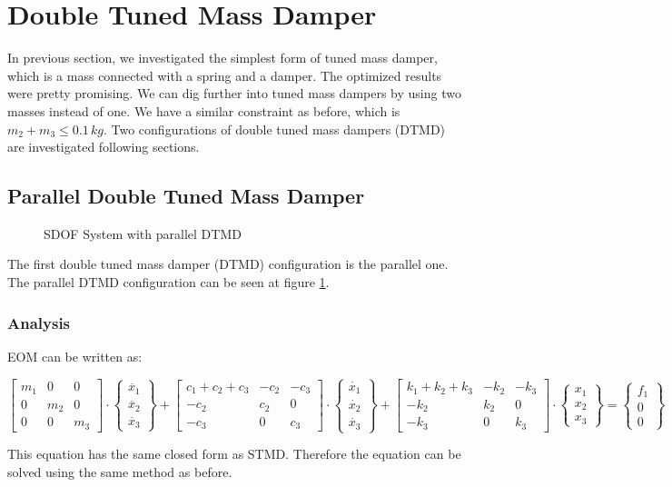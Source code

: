 \section{Double Tuned Mass Damper}
In previous section, we investigated the simplest form of tuned mass damper, which is a mass connected with a spring and a damper. The optimized results were pretty promising. We can dig further into tuned mass dampers by using two masses instead of one. We have a similar constraint as before, which is $m_2+m_3 \leq 0.1\,kg$. Two configurations of double tuned mass dampers (DTMD) are investigated following sections.
\subsection{Parallel Double Tuned Mass Damper}
\begin{figure}[ht]
    \centering
    
    \caption{SDOF System with parallel DTMD}
    \label{fig:pDTMD}
\end{figure}
The first double tuned mass damper (DTMD) configuration is the parallel one. The parallel DTMD configuration can be seen at figure \ref{fig:pDTMD}.
\subsubsection{Analysis}
EOM can be written as:
\begin{center}
$$
\begin{bmatrix}
m_1 & 0 & 0\\
0 & m_2 & 0\\
0 & 0 & m_3
\end{bmatrix}\cdot
\begin{Bmatrix}
\ddot{x_1}\\
\ddot{x_2}\\
\ddot{x_3}
\end{Bmatrix}+
\begin{bmatrix}
c_1+c_2+c_3 & -c_2 & -c_3\\
-c_2 & c_2 & 0\\
-c_3 & 0 & c_3
\end{bmatrix}\cdot
\begin{Bmatrix}
\dot{x_1}\\
\dot{x_2}\\
\dot{x_3}
\end{Bmatrix}+
\begin{bmatrix}
k_1+k_2+k_3 & -k_2 & -k_3\\
-k_2 & k_2 & 0\\
-k_3 & 0 & k_3
\end{bmatrix}\cdot
\begin{Bmatrix}
x_1\\
x_2\\
x_3
\end{Bmatrix} =
\begin{Bmatrix}
f_1\\
0\\
0
\end{Bmatrix}
$$
\end{center}
This equation has the same closed form as STMD. Therefore the equation can be solved using the same method as before.
